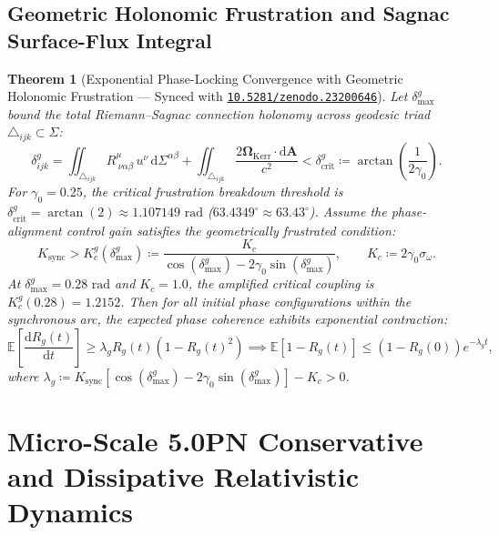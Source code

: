 \documentclass[11pt,a4paper,reqno]{article}
\newcommand{\zenodo}[1]{\href{https://doi.org/10.5281/zenodo.#1}{\texttt{10.5281/zenodo.#1}}}
\theoremstyle{plain}
\newtheorem{theorem}{Theorem}[section]
\theoremstyle{definition}
\theoremstyle{remark}
\numberwithin{equation}{section}
\begin{document}
\subsection{Geometric Holonomic Frustration and Sagnac Surface-Flux Integral}
\begin{theorem}[Exponential Phase-Locking Convergence with Geometric Holonomic Frustration --- Synced with \zenodo{23200646}]
\label{thm:curved_kuramoto}
Let $\delta_{\max}^g$ bound the total Riemann--Sagnac connection holonomy across geodesic triad $\triangle_{ijk} \subset \Sigma$:
\begin{equation}
\delta_{ijk}^g = \iint_{\triangle_{ijk}} R^\mu_{\ \nu\alpha\beta}\,u^\nu\,\mathrm{d}\Sigma^{\alpha\beta} + \iint_{\triangle_{ijk}} \frac{2\bm{\Omega}_{\mathrm{Kerr}} \cdot \mathrm{d}\mathbf{A}}{c^2} < \delta_{\mathrm{crit}}^g \coloneqq \arctan\!\left(\frac{1}{2\gamma_0}\right).
\end{equation}
For $\gamma_0 = 0.25$, the critical frustration breakdown threshold is $\delta_{\mathrm{crit}}^g = \arctan(2) \approx 1.107149\text{ rad}$ ($63.4349^\circ \approx 63.43^\circ$). Assume the phase-alignment control gain satisfies the geometrically frustrated condition:
\begin{equation}
K_{\mathrm{sync}} > K_c^g(\delta_{\max}^g) \coloneqq \frac{K_c}{\cos(\delta_{\max}^g) - 2 \gamma_0 \sin(\delta_{\max}^g)}, \qquad K_c \coloneqq 2 \gamma_0 \sigma_\omega.
\end{equation}
At $\delta_{\max}^g = 0.28\text{ rad}$ and $K_c = 1.0$, the amplified critical coupling is $K_c^g(0.28) = \mathbf{1.2152}$. Then for all initial phase configurations within the synchronous arc, the expected phase coherence exhibits exponential contraction:
\begin{equation}
\mathbb{E}\left[ \frac{\mathrm{d}R_g(t)}{\mathrm{d}t} \right] \ge \lambda_g R_g(t) \left(1 - R_g(t)^2\right) \implies \mathbb{E}[1 - R_g(t)] \le (1 - R_g(0)) e^{-\lambda_g t},
\label{eq:exp_decay_bound}
\end{equation}
where $\lambda_g \coloneqq K_{\mathrm{sync}} [ \cos(\delta_{\max}^g) - 2 \gamma_0 \sin(\delta_{\max}^g) ] - K_c > 0$.
\end{theorem}

\bigskip

\section{Micro-Scale 5.0PN Conservative and Dissipative Relativistic Dynamics}
\label{sec:pn50_eom}
\end{document}
